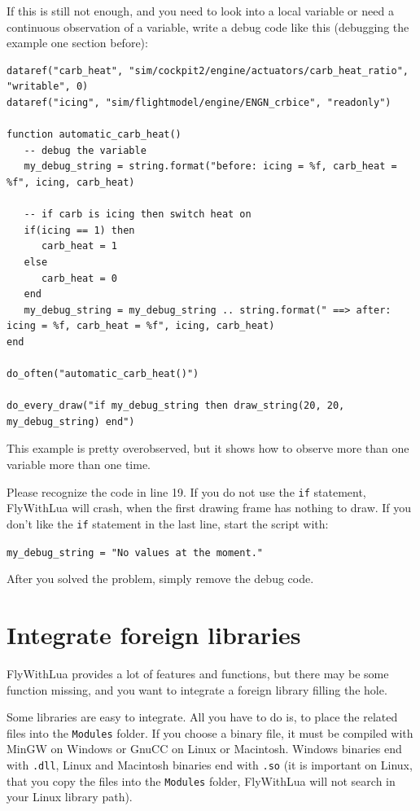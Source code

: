 \documentclass[11pt,parskip=half,a4paper]{scrartcl}
\begin{document}
If this is still not enough, and you need to look into a local variable or need a continuous observation of a variable, write a debug code like this (debugging the example one section before):

\begin{lstlisting}
dataref("carb_heat", "sim/cockpit2/engine/actuators/carb_heat_ratio", "writable", 0)
dataref("icing", "sim/flightmodel/engine/ENGN_crbice", "readonly")

function automatic_carb_heat()
   -- debug the variable
   my_debug_string = string.format("before: icing = %f, carb_heat = %f", icing, carb_heat)

   -- if carb is icing then switch heat on 
   if(icing == 1) then
      carb_heat = 1
   else
      carb_heat = 0
   end	
   my_debug_string = my_debug_string .. string.format(" ==> after: icing = %f, carb_heat = %f", icing, carb_heat)
end

do_often("automatic_carb_heat()")

do_every_draw("if my_debug_string then draw_string(20, 20, my_debug_string) end")\end{lstlisting}

This example is pretty overobserved, but it shows how to observe more than one variable more than one time.

Please recognize the code in line 19. If you do not use the \verb|if| statement, FlyWithLua will crash, when the first drawing frame has nothing to draw. If you don't like the \verb|if| statement in the last line, start the script with:

\verb|my_debug_string = "No values at the moment."|

After you solved the problem, simply remove the debug code.

\section{Integrate foreign libraries}

FlyWithLua provides a lot of features and functions, but there may be some function missing, and you want to integrate a foreign library filling the hole.

Some libraries are easy to integrate. All you have to do is, to place the related files into the \verb|Modules| folder. If you choose a binary file, it must be compiled with MinGW on Windows or GnuCC on Linux or Macintosh. Windows binaries end with \verb|.dll|, Linux and Macintosh binaries end with \verb|.so| (it is important on Linux, that you copy the files into the \verb|Modules| folder, FlyWithLua will not search in your Linux library path).
\end{document}
